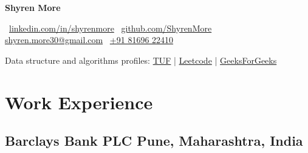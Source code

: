 \documentclass[a4,10pt]{article}
\begin{document}



\begin{center}
    {\Huge \bfseries Shyren More} \\
    
    \vspace{2pt}
    
    \faLinkedin\, \href{https://linkedin.com/in/shyrenmore/}{linkedin.com/in/shyrenmore} \hspace{1em}
    \faGithub\, \href{https://github.com/ShyrenMore}{github.com/ShyrenMore} \hspace{1em}
    \faEnvelope\, \href{mailto:shyren.more30@gmail.com}{shyren.more30@gmail.com} \hspace{1em}
    \faPhone\, \href{tel:+918169622410}{+91 81696 22410}

    \vspace{4pt}

    Data structure and algorithms profiles:
    \href{https://takeuforward.org/profile/shyren_more}{TUF} |
    \href{https://leetcode.com/shyren_more/}{Leetcode} |  
    \href{https://www.geeksforgeeks.org/user/shyrenmore30/}{GeeksForGeeks}
\end{center}



\vspace{-18pt}
\section{Work Experience}

\subsection*{Barclays Bank PLC \hfill {\normalsize\normalfont Pune, Maharashtra, India}}
\end{document}
